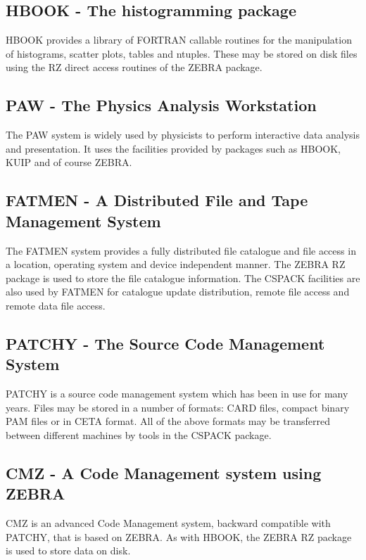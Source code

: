 \subsection{HBOOK - The histogramming package}
\par
{}
HBOOK provides a library of FORTRAN callable routines for the manipulation
of histograms, scatter plots, tables and ntuples. These may be stored
on disk files using the RZ direct access routines of the ZEBRA package.
\subsection{PAW - The Physics Analysis Workstation}
\par
The PAW system is widely used by physicists to perform
interactive data analysis and presentation.
It uses the facilities provided by packages such as HBOOK, KUIP
and of course ZEBRA.
\subsection{FATMEN - A Distributed File and Tape Management System}
\par
{}
The FATMEN system provides a fully distributed file catalogue
and file access in a location, operating system and device
independent manner. The ZEBRA RZ package is used to store
the file catalogue information. The CSPACK facilities
are also used by FATMEN for catalogue update distribution,
remote file access and remote data file access.
\subsection{PATCHY - The Source Code Management System}
\par
{}
PATCHY is a source code management system which has been in use
for many years. Files may be stored in a number of formats:
CARD files, compact binary PAM files or in CETA format. All
of the above formats may be transferred between different
machines by tools in the CSPACK package.
\subsection{CMZ - A Code Management system using ZEBRA}
\par
{}
CMZ is an advanced Code Management system, backward compatible
with PATCHY, that is based on ZEBRA. As with
HBOOK, the ZEBRA RZ package is used to store data on disk.
